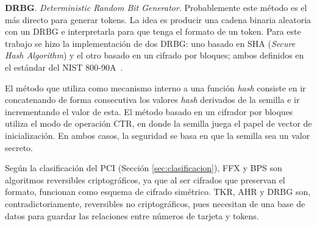 \textbf{DRBG}. \textit{Deterministic Random Bit Generator}. Probablemente este
método es el más directo para generar tokens. La idea es producir una cadena
binaria aleatoria con un DRBG e interpretarla para que tenga el formato de un
token. Para este trabajo se hizo la implementación de dos DRBG: uno basado en
SHA (\textit{Secure Hash Algorithm}) y el otro basado en un cifrado por
bloques; ambos definidos en el estándar del NIST 800-90A~\cite{nist_aleatorios}.

El método que utiliza como mecanismo interno a una función \textit{hash}
consiste en ir concatenando de forma consecutiva los valores \textit{hash}
derivados de la semilla e ir incrementando el valor de esta. El método basado en
un cifrador por bloques utiliza el modo de operación CTR, en donde la
semilla juega el papel de vector de inicialización. En ambos casos, la seguridad
se basa en que la semilla sea un valor secreto.

Según la clasificación del PCI (Sección \ref{sec:clasificacion}), FFX y BPS son
algoritmos reversibles criptográficos, ya que al ser cifrados que preservan el
formato, funcionan como esquema de cifrado simétrico. TKR, AHR y DRBG son,
contradictoriamente, reversibles no criptográficos, pues necesitan de una base
de datos para guardar las relaciones entre números de tarjeta y tokens.

